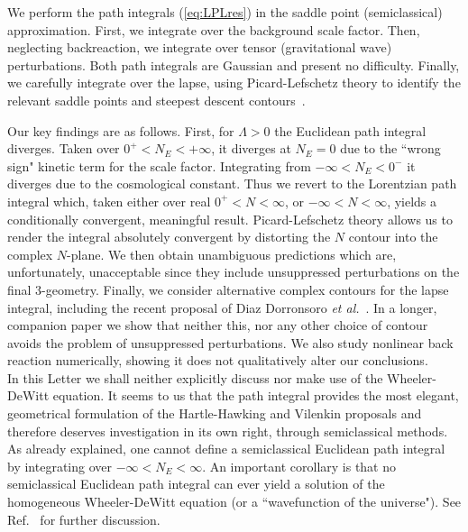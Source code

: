 \documentclass[twocolumn,amsmath,amssymb,superscriptaddress,nofootinbib]{revtex4-1}
\begin{document}
We perform the path integrals (\ref{eq:LPLres}) in the saddle point (semiclassical) approximation. First, we integrate over the background scale factor. Then, neglecting backreaction, we integrate over tensor (gravitational wave) perturbations. Both path integrals are Gaussian and present no difficulty. Finally, we carefully integrate over the lapse, using Picard-Lefschetz theory to identify the relevant saddle points and steepest descent contours~\cite{Feldbrugge:2017kzv}. 

Our key findings are as follows. First, for $\Lambda>0$ the Euclidean path integral diverges. Taken over $0^+<N_E<+\infty$, it diverges at $N_E=0$ due to the ``wrong sign" kinetic term for the scale factor. Integrating from $-\infty<N_E<0^-$ it diverges due to the cosmological constant. Thus we revert to the Lorentzian path integral which, taken either over real $0^+<N<\infty$, or  $-\infty<N<\infty$, yields a conditionally convergent, meaningful result. Picard-Lefschetz theory allows us to render the integral absolutely convergent by distorting the $N$ contour into the complex $N$-plane. We then obtain unambiguous predictions which are, unfortunately, unacceptable since they include unsuppressed perturbations on the final 3-geometry. Finally, we consider alternative complex contours for the lapse integral, including the recent proposal of Diaz Dorronsoro {\it et al.}~\cite{Dorronsoro:2017}. In a longer, companion paper \cite{Feldbrugge:2017b} we show that neither this, nor any other choice of contour avoids the problem of unsuppressed perturbations. We also study nonlinear back reaction numerically, showing it does not qualitatively alter our conclusions.  \\

In this Letter we shall neither explicitly discuss nor make use of the Wheeler-DeWitt equation. It seems to us that the path integral provides the most elegant, geometrical formulation of the Hartle-Hawking and Vilenkin proposals and therefore deserves investigation in its own right, through semiclassical methods. As already explained, one cannot define a semiclassical Euclidean path integral by integrating over $-\infty<N_E<\infty$. An important corollary is that no semiclassical Euclidean path integral can ever yield a solution of the homogeneous Wheeler-DeWitt equation (or a ``wavefunction of the universe"). See Ref.~ \cite{Feldbrugge:2017b} for further discussion. \\

\end{document}
